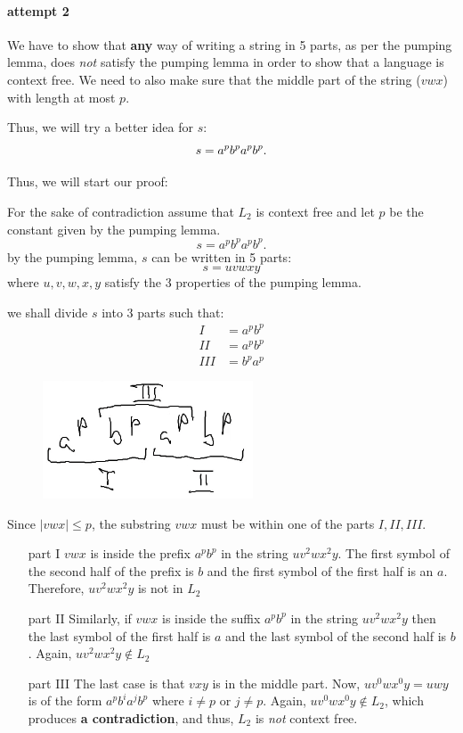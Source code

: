 \documentclass[12pt]{book}
\begin{document}
\paragraph{attempt 2}
We have to show that \textbf{any} way of writing a string in 5 parts, as per the 
pumping lemma, does \textit{not} satisfy the pumping lemma in order to show 
that a language is context free. We need to also make sure that the middle part
of the string ($vwx$) with length at most $p$.

Thus, we will try a better idea for $s$:
 \[
s = a^pb^pa^pb^p\\
.\] 

Thus, we will start our proof:

For the sake of contradiction assume that $L_2$ is context free and let $p$ be the 
constant given by the pumping lemma.
\[
s = a^pb^pa^pb^p
.\] 
by the pumping lemma, $s$ can be written in 5 parts:
\[s = uvwxy\]
where $u, v, w, x, y$ satisfy the 3 properties of the 
pumping lemma.

we shall divide $s$ into 3 parts such that:
\begin{align*}
        I &= a^pb^p\\
        II &= a^p b^p\\
        III &= b^p a^p
\end{align*}

\begin{figure}[h]
        \centering
        \includegraphics{./figures/string.png}
\end{figure}

Since $|vwx| \leq p$, the substring $vwx$ must be within one of the parts
$I, II, III$.
\begin{itemize}
        \item[part I] $vwx$ is inside the prefix $a^pb^p$ in the string
                $uv^2wx^2y$. The first symbol of the second half of
                the prefix is $b$ and the first symbol of the first half 
                is an $a$. Therefore, $uv^2wx^2y$ is not in $L_2$
        \item[part II] Similarly, if $vwx$ is inside the suffix $a^pb^p$
                in the string $uv^2wx^2y$ then the last symbol of the 
                first half is $a$ and the last symbol of the second half
                is $b$. Again, $uv^2wx^2y \not\in L_2$
        \item[part III] The last case is that $vxy$ is in the middle part.
                Now, $uv^0wx^0y = uwy$ is of the form $a^pb^ia^jb^p$
                where $i \neq p$ or $j \neq p$. Again, 
                $uv^0wx^0y \not\in L_2$, which produces \textbf{a 
                contradiction},
                and thus, $L_2$ is \textit{not} context free.
\end{itemize}
\end{document}
